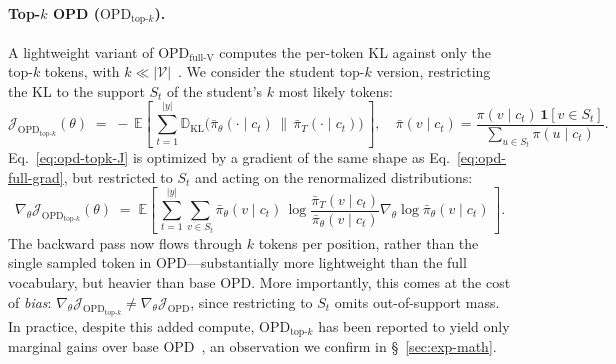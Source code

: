 \documentclass{article}
\begin{document}
\paragraph{Top-$k$ OPD ($\text{OPD}_\text{top-$k$}$).}
A lightweight variant of $\text{OPD}_\text{full-V}$ computes the per-token KL against only the top-$k$ tokens, with $k \ll |\mathcal{V}|$~\citep{li2026rethinkingopd}. We consider the student top-$k$ version, restricting the KL to the support $S_t$ of the student's $k$ most likely tokens:
\begin{equation}
\label{eq:opd-topk-J}
\mathcal{J}_{\text{OPD}_\text{top-$k$}}(\theta)
\;=\;
-\,\mathbb{E}\!\left[\, \sum_{t=1}^{|y|} \mathbb{D}_\mathrm{KL}\!\bigl(\bar\pi_\theta(\cdot\mid c_t) \,\big\|\, \bar\pi_T(\cdot\mid c_t)\bigr) \,\right],
\quad
\bar\pi(v\mid c_t) = \frac{\pi(v\mid c_t)\,\mathbf{1}[v \in S_t]}{\sum_{u \in S_t} \pi(u\mid c_t)}.
\end{equation}
Eq.~\eqref{eq:opd-topk-J} is optimized by a gradient of the same shape as Eq.~\eqref{eq:opd-full-grad}, but restricted to $S_t$ and acting on the renormalized distributions:
\begin{equation}
\label{eq:opd-topk-grad}
\nabla_\theta\mathcal{J}_{\text{OPD}_\text{top-$k$}}(\theta)
\;=\;
\mathbb{E}\!\left[\, \sum_{t=1}^{|y|} \sum_{v \in S_t}
\bar\pi_\theta(v\mid c_t)\,\log\frac{\bar\pi_T(v\mid c_t)}{\bar\pi_\theta(v\mid c_t)}
\nabla_\theta\log \bar\pi_\theta(v\mid c_t) \,\right].
\end{equation}
The backward pass now flows through $k$ tokens per position, rather than the single sampled token in OPD---substantially more lightweight than the full vocabulary, but heavier than base OPD. More importantly, this comes at the cost of \emph{bias}: $\nabla_\theta\mathcal{J}_{\text{OPD}_\text{top-$k$}} \neq \nabla_\theta\mathcal{J}_\text{OPD}$, since restricting to $S_t$ omits out-of-support mass. In practice, despite this added compute, $\text{OPD}_\text{top-$k$}$ has been reported to yield only marginal gains over base OPD~\citep{li2026rethinkingopd}, an observation we confirm in \S~\ref{sec:exp-math}.
\end{document}
